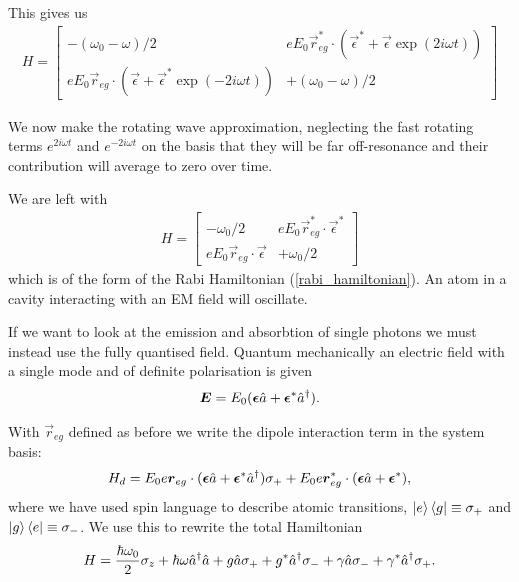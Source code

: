 This gives us
\begin{align}
  H =
  \begin{bmatrix}
    -(\omega_0-\omega)/2 & eE_0\vec{r}_{eg}^*\cdot(\vec{\epsilon}^* + \vec{\epsilon}\exp(2i\omega t)) \\
    eE_0\vec{r}_{eg}\cdot(\vec{\epsilon} + \vec{\epsilon}^*\exp(-2i\omega t)) & +(\omega_0-\omega)/2
  \end{bmatrix}
\end{align}

We now make the rotating wave approximation, neglecting the fast rotating terms $e^{2i\omega t}$ and $e^{-2i\omega t}$ on the basis that they will be far off-resonance and their contribution will average to zero over time. 

We are left with
\begin{align}
  H =
  \begin{bmatrix}
    -\omega_0/2 & eE_0\vec{r}_{eg}^*\cdot\vec{\epsilon}^* \\
    eE_0\vec{r}_{eg}\cdot\vec{\epsilon} & +\omega_0/2
  \end{bmatrix}
\end{align}
which is of the form of the Rabi Hamiltonian (\ref{rabi_hamiltonian}). An atom in a cavity interacting with an EM field will oscillate.

If we want to look at the emission and absorbtion of single photons we must instead use the fully quantised field. Quantum mechanically an electric field with a single mode and of definite polarisation is given
\begin{align}
  {\boldsymbol{E}} = E_0 ({\boldsymbol{\epsilon}}\hat{a}+ {\boldsymbol{\epsilon}}^*\hat{a}^\dagger).
\end{align}

With $\vec{r}_{eg}$ defined as before we write the dipole interaction term in the system basis:
\begin{align}
  H_d = E_0 e {\boldsymbol{r}}_{eg}\cdot({\boldsymbol{\epsilon}}\hat{a} + {\boldsymbol{\epsilon}}^*\hat{a}^\dagger)\mathbf{\sigma}_{+} + E_0 e {\boldsymbol{r}}_{eg}^* \cdot({\boldsymbol{\epsilon}}\hat{a} + {\boldsymbol{\epsilon}}^*),
\end{align}
where we have used spin language to describe atomic transitions, $\left\vert e\right\rangle\left\langle g\right\vert \equiv \mathbf{\sigma}_{+}$ and $\left\vert g\right\rangle\left\langle e\right\vert \equiv \mathbf{\sigma}_{-}$. We use this to rewrite the total Hamiltonian
\begin{align}
  H = \frac{\hbar \omega_0}{2} \mathbf{\sigma}_z + \hbar \omega \hat{a}^\dagger\hat{a} + g\hat{a} \mathbf{\sigma}_{+} + g^{*}\hat{a}^\dagger \mathbf{\sigma}_{-} + \gamma\hat{a} \mathbf{\sigma}_{-} + \gamma^{*}\hat{a}^\dagger \mathbf{\sigma}_{+}. 
\end{align}

